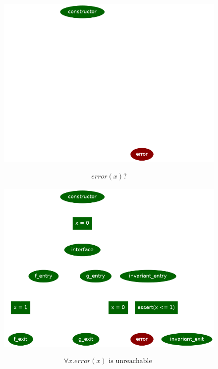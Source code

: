 \documentclass[aspectratio=169,10pt]{beamer}
\begin{document}
\begin{frame}[fragile]
\begin{figure}
\noindent\begin{minipage}{.49\textwidth}
	\includegraphics[scale=0.3]{images/state_machine_reachability}
\end{minipage}
\noindent\begin{minipage}{.49\textwidth}
{\small
\begin{align*}
	error(x) ?
\end{align*}
}%
\end{minipage}
\end{figure}
\end{frame}

\begin{frame}[fragile]
\begin{figure}
\noindent\begin{minipage}{.49\textwidth}
	\includegraphics[scale=0.3]{images/state_machine_unreachable}
\end{minipage}
\noindent\begin{minipage}{.49\textwidth}
{\small
\begin{align*}
\forall x . error(x)\text{ is unreachable }
\end{align*}
}%
\end{minipage}
\end{figure}
\end{frame}
\end{document}
